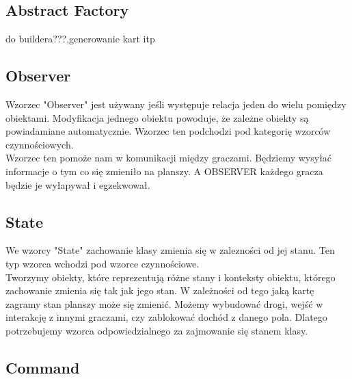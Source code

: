 \documentclass[a4paper, 11pt]{article}
\begin{document}
	\subsection{Abstract Factory}
	do buildera???,generowanie kart itp\\
	\subsection{Observer}
	Wzorzec "Observer" jest używany jeśli występuje relacja jeden do wielu pomiędzy obiektami. Modyfikacja jednego obiektu powoduje, że zależne obiekty są powiadamiane automatycznie. Wzorzec ten podchodzi pod kategorię wzorców czynnościowych.\\
Wzorzec ten pomoże nam w komunikacji między graczami. Będziemy wysyłać informacje o tym co się zmieniło na planszy. A OBSERVER każdego gracza będzie je wyłapywał i egzekwował.
	\subsection{State}
	\indent
We wzorcy "State" zachowanie klasy zmienia się w zalezności od jej stanu. Ten typ wzorca wchodzi pod wzorce czynnościowe.\\
Tworzymy obiekty, które reprezentują różne stany i konteksty obiektu, którego zachowanie zmienia się tak jak jego stan.
W zależności od tego jaką kartę zagramy stan planszy może się zmienić. Możemy wybudować drogi, wejść w interakcję z innymi graczami, czy zablokować dochód z danego pola. Dlatego potrzebujemy wzorca odpowiedzialnego za zajmowanie się stanem klasy.
	\subsection{Command}
	
\end{document}
